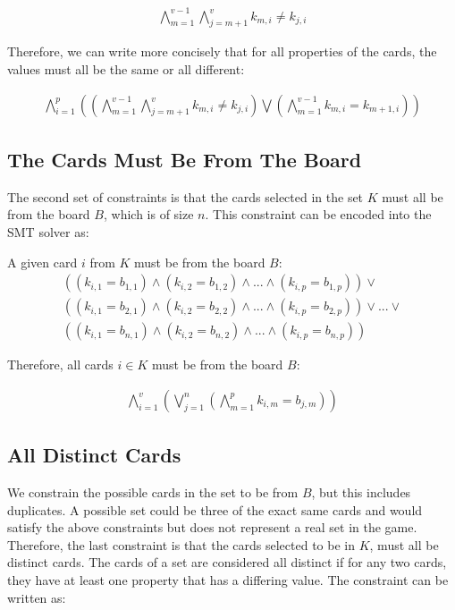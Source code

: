 \documentclass[pageno]{jpaper}
\begin{document}
\begin{align}
	\bigwedge \limits_{m=1}^{v-1}  \bigwedge \limits_{j = m+1}^{v} k_{m,i} \neq k_{j,i}
\end{align}


Therefore, we can write more concisely that for all properties of the cards, the values must all be the same or all different:

\begin{align}
	\bigwedge \limits_{i=1}^{p}  \left(  \left( \bigwedge \limits_{m=1}^{v-1}  \bigwedge \limits_{j = m+1}^{v} k_{m,i} \neq k_{j,i} \right)  \bigvee  	 \left(  \bigwedge \limits_{m=1}^{v-1} k_{m,i} = k_{m+1,i} \right) \right)
\end{align}


\subsection{The Cards Must Be From The Board}

The second set of constraints is that the cards selected in the set $K$ must all be from the board $B$, which is of size $n$. This constraint can be encoded into the SMT solver as:

A given card $i$ from $K$ must be from the board $B$:
\begin{multline}
	((k_{i,1} = b_{1,1}) \wedge (k_{i,2} = b_{1,2}) \wedge ... \wedge (k_{i,p} = b_{1,p})) \vee \\
	 ((k_{i,1} = b_{2,1}) \wedge (k_{i,2} = b_{2,2}) \wedge ... \wedge (k_{i,p} = b_{2,p}))  \vee ... \vee \\ ((k_{i,1} = b_{n,1}) \wedge (k_{i,2} = b_{n,2}) \wedge ... \wedge (k_{i,p} = b_{n,p})) 
\end{multline}

Therefore, all cards $i \in K$ must be from the board $B$:
 
\begin{align}
	\bigwedge \limits_{i=1}^{v}  \left( \bigvee \limits_{j = 1}^{n}  \left( \bigwedge \limits_{m=1}^{p}  k_{i,m} = b_{j,m}\right) \right)
\end{align}

\subsection{All Distinct Cards}

We constrain the possible cards in the set to be from $B$, but this includes duplicates. A possible set could be three of the exact same cards and would satisfy the above constraints but does not represent a real set in the game. Therefore, the last constraint is that the cards selected to be in $K$, must all be distinct cards. The cards of a set are considered all distinct if for any two cards, they have at least one property that has a differing value. The constraint can be written as:
\end{document}
